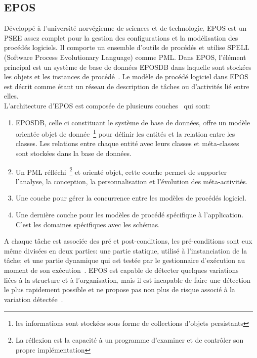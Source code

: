 \subsection*{EPOS}
Développé à l'université norvégienne de sciences et de technologie, EPOS est un PSEE assez complet pour la gestion des configurations et la modélisation des procédés logiciels.
Il comporte un ensemble d'outils de procédés et utilise SPELL (Software Process Evolutionary Language) comme PML.
Dans EPOS, l'élément principal est un système de base de données \og EPOSDB \fg{} dans laquelle sont stockées les objets et les instances de procédé~\cite{capri}. 
Le modèle de procédé logiciel dans EPOS est décrit comme étant un réseau de description de tâches ou d'activités lié entre elles.\\
L'architecture d'EPOS est composée de plusieurs couches~\cite{tpme} qui sont:
\begin{enumerate}
\item EPOSDB, celle ci constituant le système de base de données, offre un modèle orientée objet de donnée~\footnote{les informations sont stockées sous forme de collections d'objets persistants} pour définir les entités et la relation entre les classes. Les relations entre chaque entité avec leurs classes et méta-classes sont stockées dans la base de données.
\item Un PML réfléchi~\footnote{La réflexion est la capacité à un programme d'examiner et de contrôler son propre implémentation} et orienté objet, cette couche permet de supporter l'analyse, la conception, la personnalisation et l'évolution des méta-activités.
\item Une couche pour gérer la concurrence entre les modèles de procédés logiciel.
\item Une dernière couche pour les modèles de procédé spécifique à l'application. C'est les domaines spécifiques avec les schémas.
\end{enumerate}
A chaque tâche est associée des pré et post-conditions, les pré-conditions sont eux même divisées en deux parties: une partie statique, utilisé à l'instanciation de la tâche; et une partie dynamique qui est testée par le gestionnaire d'exécution au moment de son exécution~\cite{capri}.
EPOS est capable de détecter quelques variations liées à la structure et à l'organisation, mais il est incapable de faire une détection le plus rapidement possible et ne propose pas non plus de risque associé à la variation détectée~\cite{alm2224}.
